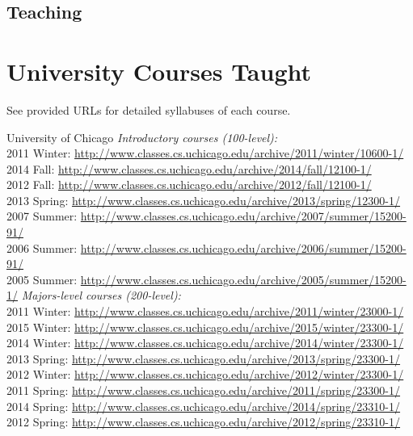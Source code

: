 \documentclass{resume}
\begin{document}
\pagebreak

\begin{center}
\section*{\huge Teaching}
\vspace{2ex}
\end{center}

\section*{\hspace{-1cm}University Courses Taught}

See provided URLs for detailed syllabuses of each course.

\begin{category}{University of Chicago} 
\citemnobullet \emph{Introductory courses (100-level):}
\\
2011 Winter: \url{http://www.classes.cs.uchicago.edu/archive/2011/winter/10600-1/}
\\
2014 Fall: \url{http://www.classes.cs.uchicago.edu/archive/2014/fall/12100-1/}\\
2012 Fall: \url{http://www.classes.cs.uchicago.edu/archive/2012/fall/12100-1/}
\\
2013 Spring: \url{http://www.classes.cs.uchicago.edu/archive/2013/spring/12300-1/}
\\
2007 Summer: \url{http://www.classes.cs.uchicago.edu/archive/2007/summer/15200-91/}\\
2006 Summer: \url{http://www.classes.cs.uchicago.edu/archive/2006/summer/15200-91/}\\
2005 Summer: \url{http://www.classes.cs.uchicago.edu/archive/2005/summer/15200-1/}
\citemnobullet \emph{Majors-level courses (200-level):}
\\
2011 Winter: \url{http://www.classes.cs.uchicago.edu/archive/2011/winter/23000-1/}
\\
2015 Winter: \url{http://www.classes.cs.uchicago.edu/archive/2015/winter/23300-1/}\\
2014 Winter: \url{http://www.classes.cs.uchicago.edu/archive/2014/winter/23300-1/}\\
2013 Spring: \url{http://www.classes.cs.uchicago.edu/archive/2013/spring/23300-1/}\\
2012 Winter: \url{http://www.classes.cs.uchicago.edu/archive/2012/winter/23300-1/}\\
2011 Spring: \url{http://www.classes.cs.uchicago.edu/archive/2011/spring/23300-1/}
\\
2014 Spring: \url{http://www.classes.cs.uchicago.edu/archive/2014/spring/23310-1/}
2012 Spring: \url{http://www.classes.cs.uchicago.edu/archive/2012/spring/23310-1/}
\end{category}
\end{document}
